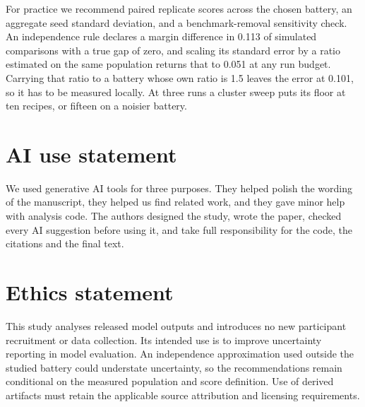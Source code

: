 \documentclass{article}
\begin{document}
For practice we recommend paired replicate scores across the chosen battery, an aggregate seed standard deviation, and a benchmark-removal sensitivity check. An independence rule declares a margin difference in 0.113 of simulated comparisons with a true gap of zero, and scaling its standard error by a ratio estimated on the same population returns that to 0.051 at any run budget. Carrying that ratio to a battery whose own ratio is 1.5 leaves the error at 0.101, so it has to be measured locally. At three runs a cluster sweep puts its floor at ten recipes, or fifteen on a noisier battery.

\label{maintext:end}
\section*{AI use statement}
We used generative AI tools for three purposes. They helped polish the wording of the manuscript, they helped us find related work, and they gave minor help with analysis code. The authors designed the study, wrote the paper, checked every AI suggestion before using it, and take full responsibility for the code, the citations and the final text.

\section*{Ethics statement}
This study analyses released model outputs and introduces no new participant recruitment or data collection. Its intended use is to improve uncertainty reporting in model evaluation. An independence approximation used outside the studied battery could understate uncertainty, so the recommendations remain conditional on the measured population and score definition. Use of derived artifacts must retain the applicable source attribution and licensing requirements.
\end{document}
